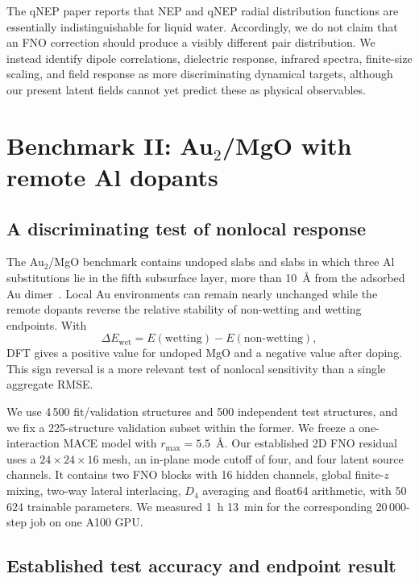 \documentclass[11pt]{article}
\newcommand{\angstrom}{\ensuremath{\text{\AA}}}
\begin{document}
The qNEP paper reports that NEP and qNEP radial distribution functions are
essentially indistinguishable for liquid water. Accordingly, we do not claim
that an FNO correction should produce a visibly different pair distribution.
We instead identify dipole correlations, dielectric response, infrared
spectra, finite-size scaling, and field response as more discriminating
dynamical targets, although our present latent fields cannot yet predict
these as physical observables.

\section{\texorpdfstring{Benchmark II: Au$_2$/MgO with remote Al dopants}{Benchmark II: Au2/MgO with remote Al dopants}}
\label{sec:aumgo}

\subsection{A discriminating test of nonlocal response}

The Au$_2$/MgO benchmark contains undoped slabs and slabs in which three Al
substitutions lie in the fifth subsurface layer, more than 10~\angstrom{} from
the adsorbed Au dimer~\citep{king2025charges,kim2025universal}. Local Au environments can
remain nearly unchanged while the remote dopants reverse the relative
stability of non-wetting and wetting endpoints. With
\begin{equation}
 \Delta E_{\mathrm{wet}}=
 E(\mathrm{wetting})-E(\mathrm{non\mbox{-}wetting}),
\end{equation}
DFT gives a positive value for undoped MgO and a negative value after doping.
This sign reversal is a more relevant test of nonlocal sensitivity than a
single aggregate RMSE.

We use 4\,500 fit/validation structures and 500 independent test structures,
and we fix a 225-structure validation subset within the former. We freeze a
one-interaction MACE model with \(r_{\max}=5.5\)~\angstrom. Our established
2D FNO residual uses a
\(24\times24\times16\) mesh, an in-plane mode cutoff of four, and four latent
source channels. It contains two FNO blocks with 16 hidden channels, global
finite-\(z\) mixing, two-way lateral interlacing, \(D_4\) averaging and float64
arithmetic, with 50\,624 trainable
parameters. We measured 1~h 13~min for the corresponding 20\,000-step job on
one A100 GPU.


\subsection{Established test accuracy and endpoint result}
\end{document}
